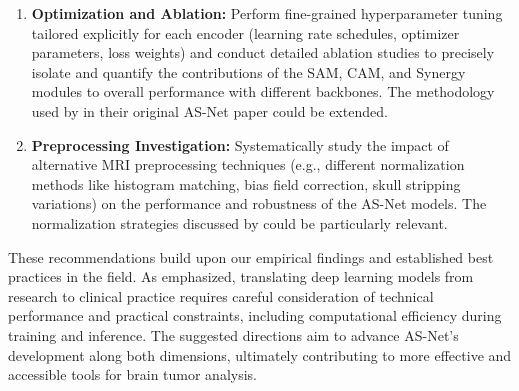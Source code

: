 \begin{enumerate}
  \item \textbf{Optimization and Ablation:} Perform fine-grained hyperparameter tuning tailored explicitly for each encoder (learning rate schedules, optimizer parameters, loss weights) and conduct detailed ablation studies to precisely isolate and quantify the contributions of the SAM, CAM, and Synergy modules to overall performance with different backbones. The methodology used by \textcite{hu2022asnet} in their original AS-Net paper could be extended.

  \item \textbf{Preprocessing Investigation:} Systematically study the impact of alternative MRI preprocessing techniques (e.g., different normalization methods like histogram matching, bias field correction, skull stripping variations) on the performance and robustness of the AS-Net models. The normalization strategies discussed by \textcite{isensee2021nnu} could be particularly relevant.

\end{enumerate}

These recommendations build upon our empirical findings and established best practices in the field. As \textcite{litjens2017survey} emphasized, translating deep learning models from research to clinical practice requires careful consideration of technical performance and practical constraints, including computational efficiency during training and inference. The suggested directions aim to advance AS-Net's development along both dimensions, ultimately contributing to more effective and accessible tools for brain tumor analysis.